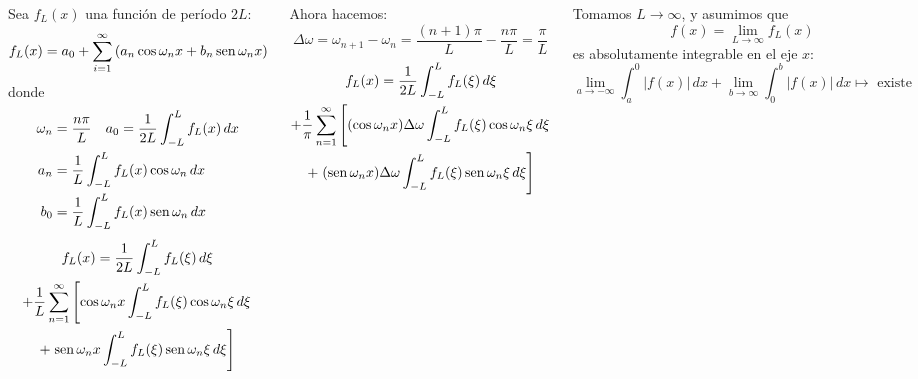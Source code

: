 \documentclass[9pt, aspectratio=169]{beamer}
\begin{document}
\begin{frame}
\begin{columns}[t]
\cx
Sea $f_L(x)$ una función de período $2L$:
\[ f_L(x) = a_0 + \sum_{i = 1}^{\infty} \left( a_n \cos \omega_n x + b_n \operatorname{sen} \omega_n x \right) \]
donde
\begin{align*}
    \omega_n &= \frac{n \pi}{L} \quad a_0= \frac{1}{2L} \int_{-L}^{L} f_L(x) \, dx \\
    a_n &= \frac{1}{L} \int_{-L}^{L} f_L(x) \cos \omega_n \, dx \\
    b_0 &= \frac{1}{L} \int_{-L}^{L} f_L(x) \operatorname{sen} \omega_n \, dx \\
\end{align*} \vspace{-3em}
\begin{multline*}
    f_L(x) = \frac{1}{2L} \int_{-L}^{L} f_L(\xi) \, d\xi \\
    + \frac{1}{L}\sum_{n = 1}^{\infty} \left[ \cos \omega_n x \int_{-L}^L f_L(\xi) \cos \omega_n \xi \, d\xi \right. \\
    + \left. \operatorname{sen} \omega_n x \int_{-L}^L f_L(\xi) \operatorname{sen} \omega_n \xi \, d\xi \right]
\end{multline*}
\pause

\cx
Ahora hacemos:
\[ \Delta \omega = \omega_{n+1} - \omega_n = \frac{(n + 1) \pi}{L} - \frac{n \pi}{L} = \frac{\pi}{L} \]
\begin{multline*}
    f_L(x) = \frac{1}{2L} \int_{-L}^{L} f_L(\xi) \, d\xi \\
    + \frac{1}{\pi}\sum_{n = 1}^{\infty} \left[ (\cos \omega_n x) \Delta \omega \int_{-L}^L f_L(\xi) \cos \omega_n \xi \, d\xi \right. \\
    + \left. (\operatorname{sen} \omega_n x) \Delta \omega \int_{-L}^L f_L(\xi) \operatorname{sen} \omega_n \xi \, d\xi \right]
\end{multline*}
\pause

Tomamos $L \rightarrow \infty$, y asumimos que
\[f(x) = \lim_{L \rightarrow \infty} f_L(x) \]
es \alert{absolutamente} integrable en el eje $x$:
\[ \lim_{a \rightarrow -\infty} \int_a^0 |f(x)| \, dx +  \lim_{b \rightarrow \infty} \int_0^b |f(x)| \, dx \mapsto \text{ existe} \]
\end{columns}
\end{frame}
\end{document}
